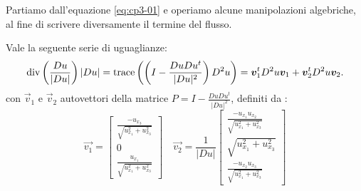 Partiamo dall'equazione \eqref{eq:cp3-01} e operiamo alcune manipolazioni algebriche, al fine di scrivere diversamente il termine del flusso. 
\begin{proposizione}
Vale la seguente serie di uguaglianze:
\[
\operatorname{div}\left(\frac{Du}{|Du|}\right)|Du|=\operatorname{trace}\left(\left(I-\frac{DuDu^t}{|Du|^2}\right)D^2u\right)=\bm{v}_1^tD^2u\bm{v}_1+\bm{v}_2^tD^2u\bm{v}_2.
\]
con $\vec{v}_1$ e $\vec{v}_2$ autovettori della matrice $P=I-\frac{DuDu^t}{|Du|^2}$, definiti da :
\[
\vec{v_1}=
\begin{bmatrix}
\frac{-u_{x_3}}{\sqrt{u_{x_1}^2+u_{x_3}^2}} \\
0 \\
\frac{u_{x_1}}{\sqrt{u_{x_1}^2+u_{x_3}^2}}
\end{bmatrix}
\quad
\vec{v_2}=\frac{1}{|Du|}
\begin{bmatrix}
\frac{-u_{x_1}u_{x_2}}{\sqrt{u_{x_1}^2+u_{x_3}^2}} \\
\sqrt{u_{x_1}^2+u_{x_3}^2} \\
\frac{-u_{x_2}u_{x_3}}{\sqrt{u_{x_1}^2+u_{x_3}^2}}
\end{bmatrix}
\]
\end{proposizione}
